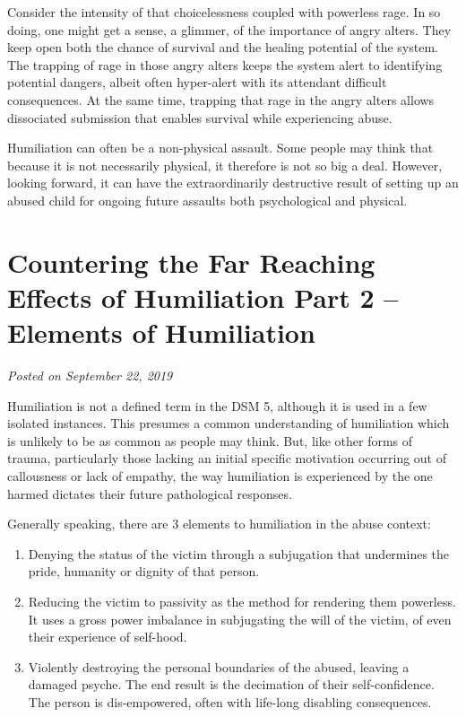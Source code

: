 \documentclass[]{book}
\begin{document}
Consider the intensity of that choicelessness coupled with powerless rage. In so doing, one might get a sense, a glimmer, of the importance of angry alters. They keep open both the chance of survival and the healing potential of the system. The trapping of rage in those angry alters keeps the system alert to identifying potential dangers, albeit often hyper-alert with its attendant difficult consequences. At the same time, trapping that rage in the angry alters allows dissociated submission that enables survival while experiencing abuse.

Humiliation can often be a non-physical assault. Some people may think that because it is not necessarily physical, it therefore is not so big a deal. However, looking forward, it can have the extraordinarily destructive result of setting up an abused child for ongoing future assaults both psychological and physical.

\hypertarget{countering-the-far-reaching-effects-of-humiliation-part-2-elements-of-humiliation}{%
\section{Countering the Far Reaching Effects of Humiliation Part 2 -- Elements of Humiliation}\label{countering-the-far-reaching-effects-of-humiliation-part-2-elements-of-humiliation}}

\emph{Posted on September 22, 2019}

Humiliation is not a defined term in the DSM 5, although it is used in a few isolated instances. This presumes a common understanding of humiliation which is unlikely to be as common as people may think. But, like other forms of trauma, particularly those lacking an initial specific motivation occurring out of callousness or lack of empathy, the way humiliation is experienced by the one harmed dictates their future pathological responses.

Generally speaking, there are 3 elements to humiliation in the abuse context:

\begin{enumerate}
\def\labelenumi{\arabic{enumi}.}
\item
  Denying the status of the victim through a subjugation that undermines the pride, humanity or dignity of that person.
\item
  Reducing the victim to passivity as the method for rendering them powerless. It uses a gross power imbalance in subjugating the will of the victim, of even their experience of self-hood.
\item
  Violently destroying the personal boundaries of the abused, leaving a damaged psyche. The end result is the decimation of their self-confidence. The person is dis-empowered, often with life-long disabling consequences.
\end{enumerate}
\end{document}
